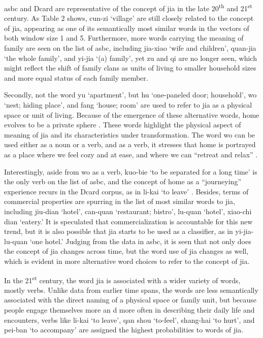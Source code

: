 \gls{asbc} and Dcard are representative of the concept of jia in the late 20\textsuperscript{th} and 21\textsuperscript{st} century. As Table 2 shows, cun-zi `village' are still closely related to the concept of jia, appearing as one of its semantically most similar words in the vectors of both window size 1 and 5. Furthermore, more words carrying the meaning of family are seen on the list of \gls{asbc}, including jia-xiao `wife and children', quan-jia `the whole family', and yi-jia `(a) family', yet zu and qi are no longer seen, which might reflect the shift of family clans as units of living to smaller household sizes and more equal status of each family member. 

Secondly, not the word yu `apartment', but hu `one-paneled door; household', wo `nest; hiding place', and fang `house; room' are used to refer to jia as a physical space or unit of living. Because of the emergence of these alternative words, home evolves to be a private sphere \parencite{mallett2004understanding}. These words highlight the physical aspect of meaning of jia and its characteristics under transformation. The word wo can be used either as a noun or a verb, and as a verb, it stresses that home is portrayed as a place where we feel cozy and at ease, and where we can ``retreat and relax'' \parencite{mallett2004understanding}. 

Interestingly, aside from wo as a verb, kuo-bie `to be separated for a long time' is the only verb on the list of \gls{asbc}, and the concept of home as a ``journeying'' experience recurs in the Dcard corpus, as in li-kai `to leave' \parencite{mallett2004understanding,samanani2019house}. Besides, terms of commercial properties are spurring in the list of most similar words to jia, including jiu-dian `hotel', can-quan `restaurant; bistro', lu-quan `hotel', xiao-chi dian `eatery.' It is speculated that commercialization is accountable for this new trend, but it is also possible that jia starts to be used as a classifier, as in yi-jia-lu-quan `one hotel.' Judging from the data in \gls{asbc}, it is seen that not only does the concept of jia changes across time, but the word use of jia changes as well, which is evident in more alternative word choices to refer to the concept of jia. 

In the 21\textsuperscript{st} century, the word jia is associated with a wider variety of words, mostly verbs. Unlike data from earlier time spans, the words are less semantically associated with the direct naming of a physical space or family unit, but because people engage themselves more an d more often in describing their daily life and encounters, verbs like li-kai `to leave', qan shou `to-feel', shang-hai `to hurt', and pei-ban `to accompany' are assigned the highest probabilities to words of jia. 

